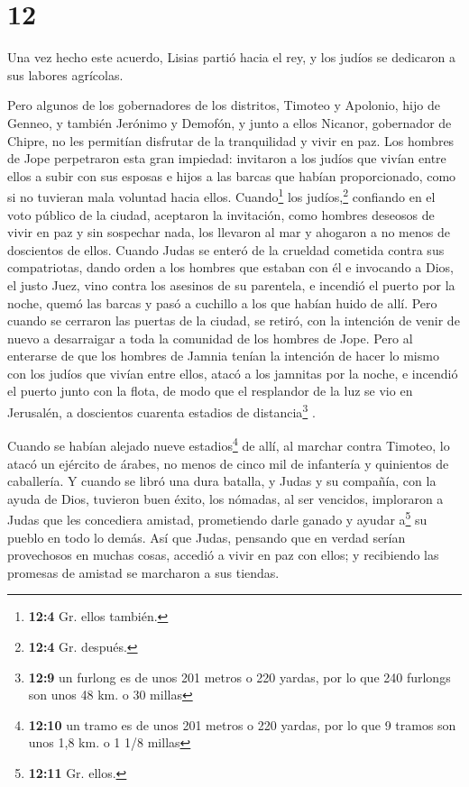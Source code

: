 \hypertarget{section-11}{%
\section{12}\label{section-11}}

 Una vez hecho este acuerdo, Lisias partió hacia el rey, y
los judíos se dedicaron a sus labores agrícolas.

 Pero algunos de los gobernadores de los distritos,
Timoteo y Apolonio, hijo de Genneo, y también Jerónimo y Demofón, y
junto a ellos Nicanor, gobernador de Chipre, no les permitían disfrutar
de la tranquilidad y vivir en paz.  Los hombres de Jope
perpetraron esta gran impiedad: invitaron a los judíos que vivían entre
ellos a subir con sus esposas e hijos a las barcas que habían
proporcionado, como si no tuvieran mala voluntad hacia ellos.
 Cuando\footnote{\textbf{12:4} Gr. ellos también.} los
judíos,\footnote{\textbf{12:4} Gr. después.} confiando en el voto
público de la ciudad, aceptaron la invitación, como hombres deseosos de
vivir en paz y sin sospechar nada, los llevaron al mar y ahogaron a no
menos de doscientos de ellos.  Cuando Judas se enteró de
la crueldad cometida contra sus compatriotas, dando orden a los hombres
que estaban con él  e invocando a Dios, el justo Juez,
vino contra los asesinos de su parentela, e incendió el puerto por la
noche, quemó las barcas y pasó a cuchillo a los que habían huido de
allí.  Pero cuando se cerraron las puertas de la ciudad,
se retiró, con la intención de venir de nuevo a desarraigar a toda la
comunidad de los hombres de Jope.  Pero al enterarse de
que los hombres de Jamnia tenían la intención de hacer lo mismo con los
judíos que vivían entre ellos,  atacó a los jamnitas por
la noche, e incendió el puerto junto con la flota, de modo que el
resplandor de la luz se vio en Jerusalén, a doscientos cuarenta estadios
de distancia\footnote{\textbf{12:9} un furlong es de unos 201 metros o
  220 yardas, por lo que 240 furlongs son unos 48 km. o 30 millas} .

 Cuando se habían alejado nueve estadios\footnote{\textbf{12:10}
  un tramo es de unos 201 metros o 220 yardas, por lo que 9 tramos son
  unos 1,8 km. o 1 1/8 millas} de allí, al marchar contra Timoteo, lo
atacó un ejército de árabes, no menos de cinco mil de infantería y
quinientos de caballería.  Y cuando se libró una dura
batalla, y Judas y su compañía, con la ayuda de Dios, tuvieron buen
éxito, los nómadas, al ser vencidos, imploraron a Judas que les
concediera amistad, prometiendo darle ganado y ayudar a\footnote{\textbf{12:11}
  Gr. ellos.} su pueblo en todo lo demás.  Así que Judas,
pensando que en verdad serían provechosos en muchas cosas, accedió a
vivir en paz con ellos; y recibiendo las promesas de amistad se
marcharon a sus tiendas.

